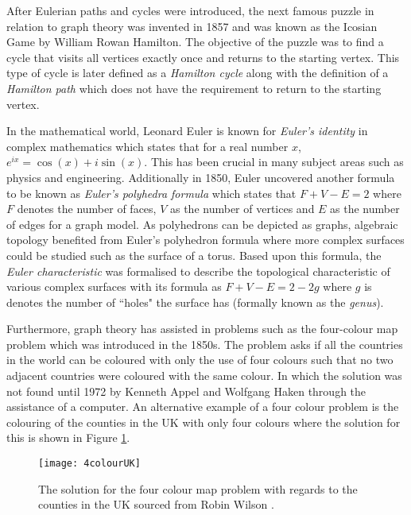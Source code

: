 After Eulerian paths and cycles were introduced, the next famous puzzle in relation to graph theory was invented in 1857 and was known as the Icosian Game \cite{carlson_2022} by William Rowan Hamilton. The objective of the puzzle was to find a cycle that visits all vertices exactly once and returns to the starting vertex. This type of cycle is later defined as a \emph{Hamilton cycle} along with the definition of a \emph{Hamilton path} which does not have the requirement to return to the starting vertex.

In the mathematical world, Leonard Euler is known for \emph{Euler's identity} in complex mathematics which states that for a real number $x$, $e^{ix}=\cos(x)+i\sin(x)$. This has been crucial in many subject areas such as physics and engineering. Additionally in 1850, Euler uncovered another formula to be known as \emph{Euler's polyhedra formula} which states that $F + V - E = 2$ where $F$ denotes the number of faces, $V$ as the number of vertices and $E$ as the number of edges for a graph model. As polyhedrons can be depicted as graphs, algebraic topology benefited from Euler's polyhedron formula where more complex surfaces could be studied such as the surface of a torus. Based upon this formula, the \emph{Euler characteristic} was formalised to describe the topological characteristic of various complex surfaces with its formula as $F + V - E = 2 - 2g$ where $g$ is denotes the number of ``holes" the surface has (formally known as the \emph{genus}). 

Furthermore, graph theory has assisted in problems such as the four-colour map problem which was introduced in the 1850s. The problem asks if all the countries in the world can be coloured with only the use of four colours such that no two adjacent countries were coloured with the same colour. In which the solution was not found until 1972 by Kenneth Appel and Wolfgang Haken \cite{Ohnishi2009} through the assistance of a computer. An alternative example of a four colour problem is the colouring of the counties in the UK with only four colours where the solution for this is shown in Figure \ref{fig:UK 4 colour}.

\begin{figure}[H]
\centering
\texttt{[image: 4colourUK]}
\caption{The solution for the four colour map problem with regards to the counties in the UK sourced from Robin Wilson \cite{4ColourRobin}.}
\label{fig:UK 4 colour}
\end{figure}

